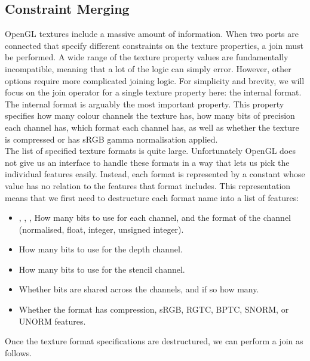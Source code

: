 \documentclass[format=sigconf]{acmart}
\begin{document}
\subsection{Constraint Merging}\label{texture-constraints}
OpenGL textures include a massive amount of information\cite{texparameter}\cite{teximage2d}. When two ports are connected that specify different constraints on the texture properties, a join must be performed. A wide range of the texture property values are fundamentally incompatible, meaning that a lot of the logic can simply error. However, other options require more complicated joining logic. For simplicity and brevity, we will focus on the join operator for a single texture property here: the internal format. The internal format is arguably the most important property. This property specifies how many colour channels the texture has, how many bits of precision each channel has, which format each channel has, as well as whether the texture is compressed or has sRGB gamma normalisation applied. \\

The list of specified texture formats is quite large\cite{texinternalformat}. Unfortunately OpenGL does not give us an interface to handle these formats in a way that lets us pick the individual features easily. Instead, each format is represented by a constant whose value has no relation to the features that format includes. This representation means that we first need to destructure each format name into a list of features: \\

\begin{itemize}
\item {}, , ,  How many bits to use for each channel, and the format of the channel (normalised, float, integer, unsigned integer).
\item {} How many bits to use for the depth channel.
\item {} How many bits to use for the stencil channel.
\item {} Whether bits are shared across the channels, and if so how many.
\item {} Whether the format has compression, sRGB, RGTC, BPTC, SNORM, or UNORM features.
\end{itemize}

Once the texture format specifications are destructured, we can perform a join as follows.
\end{document}
